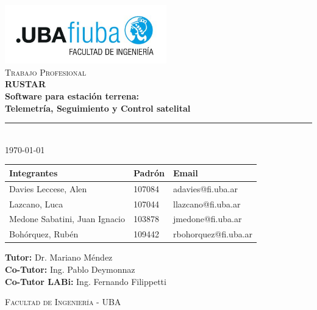 \begin{titlepage}
\begin{center}

\includegraphics[width=7cm]{./images/fiuba_logo.jpg} \\[2cm]

\textsc{\Large Trabajo Profesional} \\[0.5cm]
{\huge \bfseries RUSTAR \\
Software para estación terrena: \\
Telemetría, Seguimiento  y Control satelital} \\[1cm]

\rule{\linewidth}{0.4pt} \\[1cm]

{\large \today} \\[2cm]

\hspace*{-1.5cm}
\begin{tabular}{ | l | l | l | }
    \hline
    \textbf{Integrantes} & \textbf{Padrón} & \textbf{Email} \\ \hline
    Davies Leccese, Alen & 107084 & adavies@fi.uba.ar \\ \hline
    Lazcano, Luca & 107044 & llazcano@fi.uba.ar \\ \hline
    Medone Sabatini, Juan Ignacio & 103878 & jmedone@fi.uba.ar \\ \hline
    Bohórquez, Rubén & 109442 & rbohorquez@fi.uba.ar \\ \hline
\end{tabular}

\vspace{1cm}

\textbf{Tutor:} Dr. Mariano Méndez\\[0.2cm]
\textbf{Co-Tutor:} Ing. Pablo Deymonnaz\\[0.2cm]
\textbf{Co-Tutor LABi:} Ing. Fernando Filippetti

\vfill

\textsc{Facultad de Ingeniería - UBA}

\end{center}
\end{titlepage}